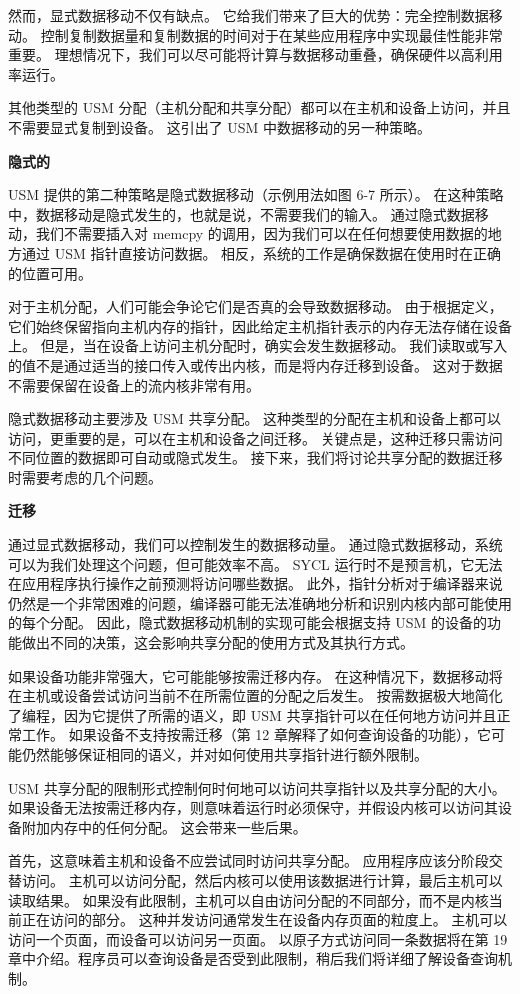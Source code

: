然而，显式数据移动不仅有缺点。 它给我们带来了巨大的优势：完全控制数据移动。 控制复制数据量和复制数据的时间对于在某些应用程序中实现最佳性能非常重要。 理想情况下，我们可以尽可能将计算与数据移动重叠，确保硬件以高利用率运行。

其他类型的 USM 分配（主机分配和共享分配）都可以在主机和设备上访问，并且不需要显式复制到设备。 这引出了 USM 中数据移动的另一种策略。

\textbf{隐式的}

USM 提供的第二种策略是隐式数据移动（示例用法如图 6-7 所示）。 在这种策略中，数据移动是隐式发生的，也就是说，不需要我们的输入。 通过隐式数据移动，我们不需要插入对 memcpy 的调用，因为我们可以在任何想要使用数据的地方通过 USM 指针直接访问数据。 相反，系统的工作是确保数据在使用时在正确的位置可用。

对于主机分配，人们可能会争论它们是否真的会导致数据移动。 由于根据定义，它们始终保留指向主机内存的指针，因此给定主机指针表示的内存无法存储在设备上。 但是，当在设备上访问主机分配时，确实会发生数据移动。 我们读取或写入的值不是通过适当的接口传入或传出内核，而是将内存迁移到设备。 这对于数据不需要保留在设备上的流内核非常有用。

隐式数据移动主要涉及 USM 共享分配。 这种类型的分配在主机和设备上都可以访问，更重要的是，可以在主机和设备之间迁移。 关键点是，这种迁移只需访问不同位置的数据即可自动或隐式发生。 接下来，我们将讨论共享分配的数据迁移时需要考虑的几个问题。

\textbf{迁移}

通过显式数据移动，我们可以控制发生的数据移动量。 通过隐式数据移动，系统可以为我们处理这个问题，但可能效率不高。 SYCL 运行时不是预言机，它无法在应用程序执行操作之前预测将访问哪些数据。 此外，指针分析对于编译器来说仍然是一个非常困难的问题，编译器可能无法准确地分析和识别内核内部可能使用的每个分配。 因此，隐式数据移动机制的实现可能会根据支持 USM 的设备的功能做出不同的决策，这会影响共享分配的使用方式及其执行方式。

如果设备功能非常强大，它可能能够按需迁移内存。 在这种情况下，数据移动将在主机或设备尝试访问当前不在所需位置的分配之后发生。 按需数据极大地简化了编程，因为它提供了所需的语义，即 USM 共享指针可以在任何地方访问并且正常工作。 如果设备不支持按需迁移（第 12 章解释了如何查询设备的功能），它可能仍然能够保证相同的语义，并对如何使用共享指针进行额外限制。

USM 共享分配的限制形式控制何时何地可以访问共享指针以及共享分配的大小。 如果设备无法按需迁移内存，则意味着运行时必须保守，并假设内核可以访问其设备附加内存中的任何分配。 这会带来一些后果。

首先，这意味着主机和设备不应尝试同时访问共享分配。 应用程序应该分阶段交替访问。 主机可以访问分配，然后内核可以使用该数据进行计算，最后主机可以读取结果。 如果没有此限制，主机可以自由访问分配的不同部分，而不是内核当前正在访问的部分。 这种并发访问通常发生在设备内存页面的粒度上。 主机可以访问一个页面，而设备可以访问另一页面。 以原子方式访问同一条数据将在第 19 章中介绍。程序员可以查询设备是否受到此限制，稍后我们将详细了解设备查询机制。

